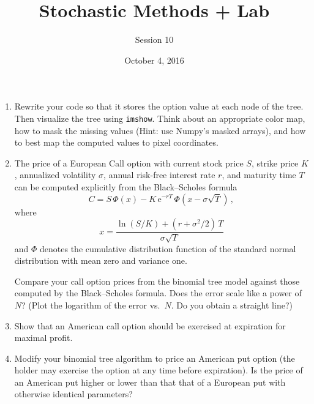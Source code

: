 \documentclass[12pt]{article}
\begin{document}
\title{Stochastic Methods + Lab}
\author{Session 10}
\date{October 4, 2016}
\maketitle

\begin{enumerate}


\item Rewrite your code so that it stores the option value at each
node of the tree.  Then visualize the tree using \texttt{imshow}.
Think about an appropriate color map, how to mask the missing values
(Hint: use Numpy's masked arrays), and how to best map the computed
values to pixel coordinates.

\item The price of a European Call option with current stock price
$S$, strike price $K$, annualized volatility $\sigma$, annual
risk-free interest rate $r$, and maturity time $T$ can be computed
explicitly from the Black--Scholes formula
\begin{equation*}
  C = S \, \Phi(x) - K \, \mathrm{e}^{-rT} \, \Phi(x-\sigma \sqrt T) \,,
\end{equation*}
where 
\begin{equation*}
  x = \frac{\ln(S/K) + (r + \sigma^2/2) \, T}{\sigma \sqrt T}
\end{equation*}
and $\Phi$ denotes the cumulative distribution function of the
standard normal distribution with mean zero and variance one.

Compare your call option prices from the binomial tree model against
those computed by the Black--Scholes formula.  Does the error scale
like a power of $N$?  (Plot the logarithm of the error vs.\ $N$.  Do
you obtain a straight line?)

\item Show that an American call option should be exercised at
expiration for maximal profit.

\item Modify your binomial tree algorithm to price an American put
option (the holder may exercise the option at any time before
expiration).  Is the price of an American put higher or lower than
that that of a European put with otherwise identical parameters?

\end{enumerate}
\end{document}
